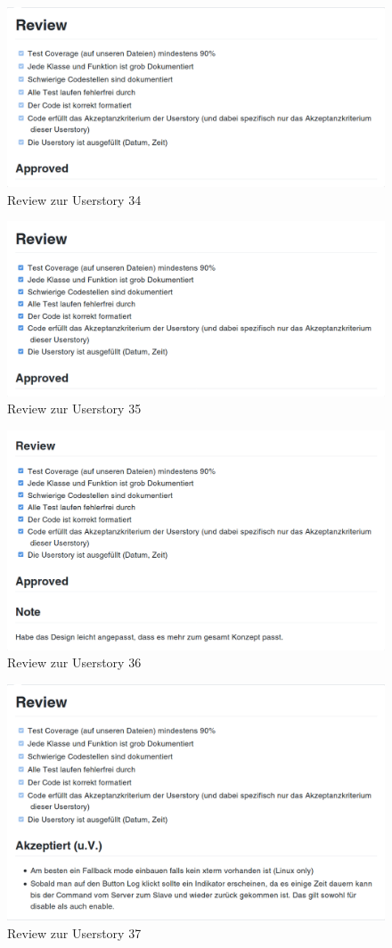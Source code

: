 \documentclass[accentcolor=tud9c,12pt,paper=a4]{tudreport}
\begin{document}
\begin{figure}[H]
\centering
\includegraphics[width=.8\textwidth]{code_review/us34}
\caption{Review zur Userstory 34}
\end{figure}

\begin{figure}[H]
\centering
\includegraphics[width=.8\textwidth]{code_review/us35}
\caption{Review zur Userstory 35}
\end{figure}

\begin{figure}[H]
\centering
\includegraphics[width=.8\textwidth]{code_review/us36}
\caption{Review zur Userstory 36}
\end{figure}

\begin{figure}[H]
\centering
\includegraphics[width=.8\textwidth]{code_review/us37}
\caption{Review zur Userstory 37}
\end{figure}
\end{document}
